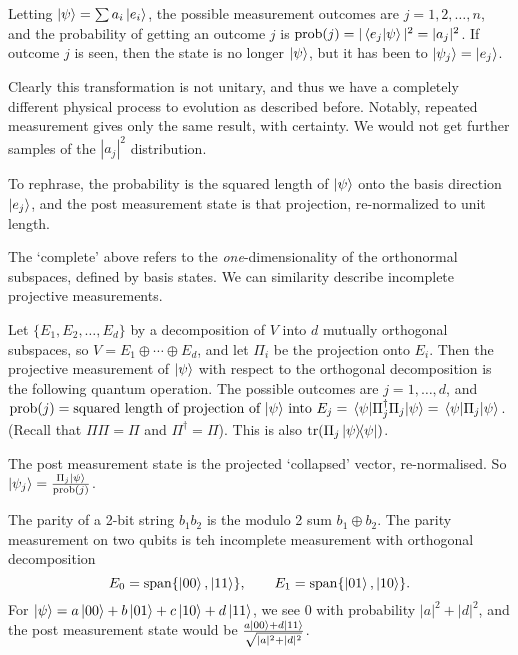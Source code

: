 \documentclass[a4paper]{article}
\begin{document}
Letting $\ket{\psi} = \sum a_i \ket{e_i}$, the possible measurement outcomes are $j = 1, 2, \dots, n$, and the probability of getting an outcome $j$ is $\operatorname{prob}(j) = |\ip{e_j}{\psi}|^2 = |a_j|^2$. If outcome $j$ is seen, then the state is no longer $\ket{\psi}$, but it has been  to $\ket{\psi_j} = \ket{e_j}$.

Clearly this transformation is not unitary, and thus we have a completely different physical process to evolution as described before.
Notably, repeated measurement gives only the same result, with certainty. We would not get further samples of the $|a_j|^2$ distribution.

To rephrase, the probability is the squared length of $\ket{\psi}$ onto the basis direction $\ket{e_j}$, and the post measurement state is that projection, re-normalized to unit length.

The `complete' above refers to the \emph{one}-dimensionality of the orthonormal subspaces, defined by basis states. We can similarity describe incomplete projective measurements.

Let $\{E_1, E_2, \dots, E_d \}$ by a decomposition of $V$ into $d$ mutually orthogonal subspaces, so $V = E_1 \oplus \cdots \oplus E_d$, and let $\Pi_i$ be the projection onto $E_i$. Then the  projective measurement of $\ket{\psi}$ with respect to the orthogonal decomposition is the following quantum operation. The possible outcomes are $j = 1, \dots, d$, and $\operatorname{prob}(j) = \text{squared length of projection of $\ket{\psi}$ into $E_j$} = \mel{\psi}{\Pi_j^{\dagger} \Pi_j}{\psi} = \mel{\psi}{\Pi_j}{\psi}$.
(Recall that $\Pi \Pi = \Pi$ and $\Pi^{\dagger} = \Pi$). This is also $\operatorname{tr}(\Pi_j \op{\psi}{\psi})$.

The post measurement state is the projected `collapsed' vector, re-normalised. So $\ket{\psi_j} = \frac{\Pi_j \ket{\psi}}{\operatorname{prob}(j)}$.

\begin{example}
	The parity of a 2-bit string $b_1b_2$ is the modulo 2 sum $b_1 \oplus b_2$. The parity measurement on two qubits is teh incomplete measurement with orthogonal decomposition
	$$
	E_0 = \operatorname{span}\{\ket{00}, \ket{11}\}, \quad \quad E_1 = \operatorname{span}\{\ket{01}, \ket{10}\}.
	$$
	For $\ket{\psi} = a \ket{00} + b\ket{01} + c\ket{10} + d\ket{11}$, we see $0$ with probability $|a|^2 + |d|^2$, and the post measurement state would be $\frac{a \ket{00} + d \ket{11}}{\sqrt{|a|^2 + |d|^2}}$.
\end{example}
\end{document}
